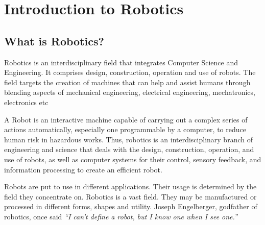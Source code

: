 \chapter{Introduction to Robotics}

\section{What is Robotics?}
\par Robotics is an interdisciplinary field that integrates Computer Science and Engineering. It comprises design, construction, operation and use of robots. The field targets the creation of machines that can help and assist humans through blending aspects of mechanical engineering, electrical engineering, mechatronics, electronics etc
\par A Robot is an interactive machine capable of carrying out a complex series of actions automatically, especially one programmable by a computer, to reduce human risk in hazardous works. Thus, robotics is an interdisciplinary branch of engineering and science that deals with the design, construction, operation, and use of robots, as well as computer systems for their control, sensory feedback, and information processing to create an efficient robot.
\par Robots are put to use in different applications. Their usage is determined by the field they concentrate on. Robotics is a vast field. They may be manufactured or processed in different forms, shapes and utility. Joseph Engelberger, godfather of robotics, once said \textit{“I can't define a robot, but I know one when I see one.”}

